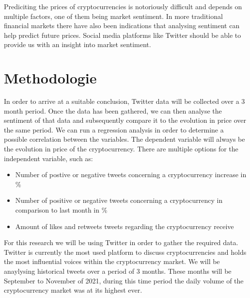 \noindent Prediciting the prices of cryptocurrencies is notoriously difficult and depends on multiple factors, one of them being market sentiment\autocite{Lewis2018}. In more traditional financial markets there have also been indications that analysing sentiment can help predict future prices\autocite{Cristescu2022}. Social media platforms like Twitter should be able to provide us with an insight into market sentiment.



\section{Methodologie}%
\label{sec:methodologie}


\noindent In order to arrive at a suitable conclusion, Twitter  data will be collected over a 3 month period. Once the data has been gathered, we can then analyse the sentiment of that data and subsequently compare it to the evolution in price over the same period. We can run a regression analysis in order to determine a possible correlation between the variables. The dependent variable will always be the evolution in price of the cryptocurrency. There are multiple options for the independent variable, such as:

\begin{itemize}
    \item Number of postive or negative tweets concerning a cryptocurrency increase in \%
    
    \item Number of positive or negative tweets concerning a cryptocurrency in comparison to last month in \%
    
    \item Amount of likes and retweets tweets regarding the cryptocurrency receive 
    
\end{itemize}
\noindent For this research we will be using Twitter in order to gather the required data. Twitter is currently the most used platform to discuss cryptocurrencies and holds the most influential voices within the cryptocurrency market. We will be anaylysing historical tweets over a period of 3 months. These months will be September to November of 2021, during this time period the daily volume of the cryptocurrency market was at its highest ever\autocite{CoinGecko2022}.

